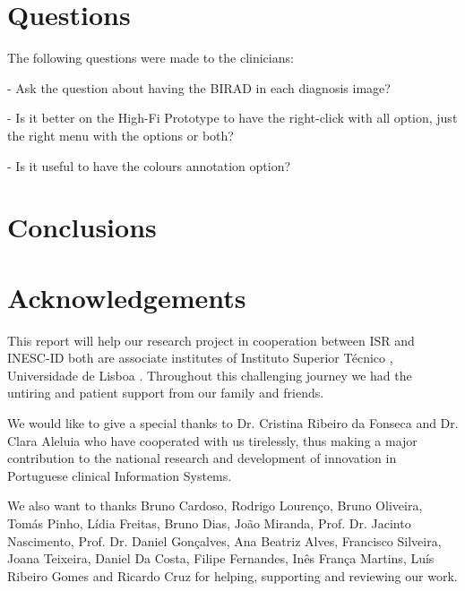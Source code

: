 \section{Questions}

The following questions were made to the clinicians:

- Ask the question about having the BIRAD in each diagnosis image?

- Is it better on the High-Fi Prototype to have the right-click with all option, just the right menu with the options or both?

- Is it useful to have the colours annotation option?

\clearpage

\section{Conclusions}

\clearpage

\section{Acknowledgements}

This report will help our research project in cooperation between ISR \cite{isr} and INESC-ID \cite{inescid} both are associate institutes of Instituto Superior T\'{e}cnico \cite{ist}, Universidade de Lisboa \cite{ul}. Throughout this challenging journey we had the untiring and patient support from our family and friends.

We would like to give a special thanks to Dr. Cristina Ribeiro da Fonseca and Dr. Clara Aleluia who have cooperated with us tirelessly, thus making a major contribution to the national research and development of innovation in Portuguese clinical Information Systems.

We also want to thanks Bruno Cardoso, Rodrigo Louren\c{c}o, Bruno Oliveira, Tom\'{a}s Pinho, L\'{i}dia Freitas, Bruno Dias, Jo\~{a}o Miranda, Prof. Dr. Jacinto Nascimento, Prof. Dr. Daniel Gon\c{c}alves, Ana Beatriz Alves, Francisco Silveira, Joana Teixeira, Daniel Da Costa, Filipe Fernandes, In\^{e}s Fran\c{c}a Martins, Lu\'{i}s Ribeiro Gomes and Ricardo Cruz for helping, supporting and reviewing our work.

\clearpage

\printbibliography


